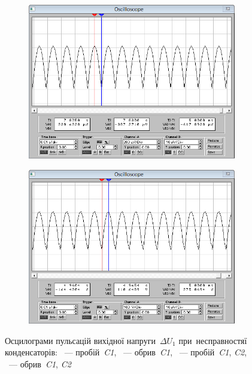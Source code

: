 \documentclass[
	a4paper,
	oneside,
	BCOR = 10mm,
	DIV = 12,
	12pt,
	headings = normal,
]{scrartcl}
\newcommand{\schel}[1]{\textit{#1}}
\begin{document}
\begin{figure}[!htbp]
\begin{subfigure}[t]{0.5\columnwidth}
					\caption{}
					\label{subfig:ewb-scope-03-02}
				\end{subfigure}
				\begin{subfigure}[t]{0.5\columnwidth}
					\centering
					\includegraphics[height = 8\baselineskip]{./assets/y03s02-pcdiag-lab-01-p03-03b.png}
					\caption{}
					\label{subfig:ewb-scope-03-03}
				\end{subfigure}%
				\begin{subfigure}[t]{0.5\columnwidth}
					\centering
					\includegraphics[height = 8\baselineskip]{./assets/y03s02-pcdiag-lab-01-p03-04b.png}
					\caption{}
					\label{subfig:ewb-scope-03-04}
				\end{subfigure}
				\caption{Осцилограми пульсацій вихідної напруги~$\Delta U_1$ при~несправностяї конденсаторів: ~— пробій~\schel{C1}, ~— обрив~\schel{C1}, ~— пробій~\schel{C1}, \schel{C2}, ~— обрив~\schel{C1}, \schel{C2}}
				\label{fig:ewb-scope-capacitor-fault}
			\end{figure}
\end{document}
